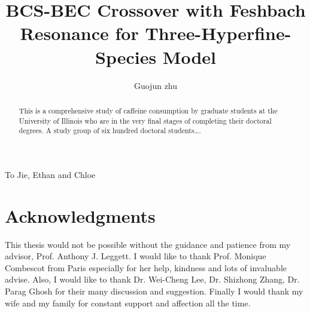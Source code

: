 \documentclass[edeposit,fullpage]{uiucthesis2009}
\begin{document}
\title{BCS-BEC Crossover with Feshbach Resonance for Three-Hyperfine-Species Model}
\author{Guojun zhu}
\phdthesis
{}
\maketitle

\frontmatter

\begin{abstract}
This is a comprehensive study of caffeine consumption by graduate
students at the University of Illinois who are in the very final
stages of completing their doctoral degrees. A study group of six
hundred doctoral students\ldots.
\end{abstract}

\begin{dedication}
To Jie, Ethan and Chloe
\end{dedication}

\chapter*{Acknowledgments}
This thesis would not be possible without the guidance and patience from my advisor, Prof. Anthony J. Leggett.  I would like to thank Prof. Monique Combescot from Paris especially for her help, kindness and lots of invaluable advise.  Also, I would like to thank Dr. Wei-Cheng Lee, Dr. Shizhong Zhang, Dr. Parag Ghosh for their many discussion and suggestion.  Finally I would thank my wife and my family for constant support and affection all the time.  

\end{document}
